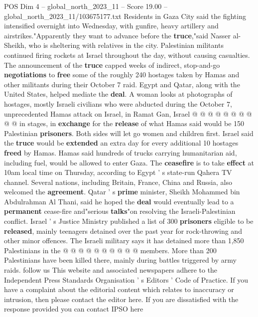 \begin{textsample}{POS Dim 4 – global\_north\_2023\_11 – Score 19.00 – global\_north\_2023\_11/103675177.txt}
Residents in Gaza City said the fighting intensified overnight into Wednesday, with gunfire, heavy artillery and airstrikes."Apparently they want to advance before the \textbf{truce},"said Nasser al-Sheikh, who is sheltering with relatives in the city.
Palestinian militants continued firing rockets at Israel throughout the day, without causing casualties.
The announcement of the \textbf{truce} capped weeks of indirect, stop-and-go \textbf{negotiations} to \textbf{free} some of the roughly 240 hostages taken by Hamas and other militants during their October 7 raid.
Egypt and Qatar, along with the United States, helped mediate the \textbf{deal}.
A woman looks at photographs of hostages, mostly Israeli civilians who were abducted during the October 7, unprecedented Hamas attack on Israel, in Ramat Gan, Israel @ @ @ @ @ @ @ @ @ @ in stages, in \textbf{exchange} for the \textbf{release} of what Hamas said would be 150 Palestinian \textbf{prisoners}.
Both sides will let go women and children first.
Israel said the \textbf{truce} would be \textbf{extended} an extra day for every additional 10 hostages \textbf{freed} by Hamas.
Hamas said hundreds of trucks carrying humanitarian aid, including fuel, would be allowed to enter Gaza.
The \textbf{ceasefire} is to take \textbf{effect} at 10am local time on Thursday, according to Egypt ' s state-run Qahera TV channel.
Several nations, including Britain, France, China and Russia, also welcomed the \textbf{agreement}.
Qatar ' s \textbf{prime} minister, Sheikh Mohammed bin Abdulrahman Al Thani, said he hoped the \textbf{deal} would eventually lead to a \textbf{permanent} cease-fire and"serious \textbf{talks}"on resolving the Israeli-Palestinian conflict.
Israel ' s Justice Ministry published a list of 300 \textbf{prisoners} eligible to be \textbf{released}, mainly teenagers detained over the past year for rock-throwing and other minor offences.
The Israeli military says it has detained more than 1,850 Palestinians in the @ @ @ @ @ @ @ @ @ @ members.
More than 200 Palestinians have been killed there, mainly during battles triggered by army raids. follow us This website and associated newspapers adhere to the Independent Press Standards Organisation ' s Editors ' Code of Practice.
If you have a complaint about the editorial content which relates to inaccuracy or intrusion, then please contact the editor here.
If you are dissatisfied with the response provided you can contact IPSO here

\end{textsample}
